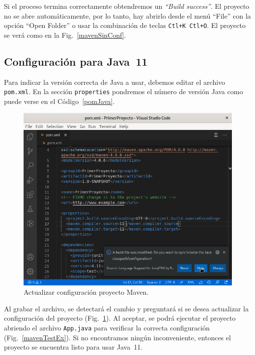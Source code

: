 Si el proceso termina correctamente obtendremos un \emph{``Build success''}.  El proyecto no se abre automáticamente, por lo tanto, hay abrirlo desde el menú ``File'' con la opción ``Open Folder'' o usar la combinación de teclas \verb|Ctl+K Ctl+O|.  El proyecto se verá como en la Fig.~\ref{mavenSinConf}.


\subsection{Configuración para Java~11}
\label{mavenJava}



Para indicar la versión correcta de Java a usar, debemos editar el archivo \verb|pom.xml|. En la sección \verb|properties| pondremos el número de versión Java como puede verse en el Código~\ref{pomJava}.
    
\begin{figure}[t]
	\centering
	\includegraphics[width=.95\textwidth]{img/MavenPomActualizar}
	\caption{Actualizar configuración proyecto Maven.}
	\label{mavenActConf}
\end{figure}

Al grabar el archivo, se detectará el cambio y preguntará si se desea actualizar la configuración del proyecto (Fig.~\ref{mavenActConf}).  Al aceptar, se podrá ejecutar el proyecto abriendo el archivo \verb|App.java| para verificar la correcta configuración (Fig.~\ref{mavenTestEx}).  Si no encontramos ningún inconveniente, entonces el proyecto se encuentra listo para usar Java~11.


